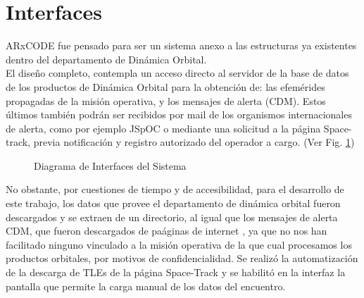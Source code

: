 \section{Interfaces}
ARxCODE fue pensado para ser un sistema anexo a las estructuras ya existentes dentro del departamento de Din\'amica Orbital.\\
El dise\~no completo, contempla un acceso directo al servidor de la base de datos de los productos de Din\'amica Orbital para la obtenci\'on de: las efem\'erides propagadas de la misi\'on operativa, y los mensajes de alerta (CDM). Estos \'ultimos tambi\'en podr\'an ser recibidos por mail de los organismos internacionales de alerta, como por ejemplo JSpOC o mediante una solicitud a la p\'agina Space-track, previa notificaci\'on y registro autorizado del operador a cargo. (Ver Fig. \ref{fig:interfaces})\\

\begin{figure}
\centering
  \caption[Diagrama de Interfaces del Sistema]{Diagrama de Interfaces del Sistema}
  \label{fig:interfaces}
\end{figure}

No obstante, por cuestiones de tiempo y de accesibilidad, para el desarrollo de este trabajo, los datos que provee el departamento de din\'amica orbital fueron descargados y se extraen de un directorio, al igual que los mensajes de alerta CDM, que fueron descargados de pa\'aginas de internet , ya que no nos han facilitado ninguno vinculado a la misi\'on operativa de la que cual procesamos los productos orbitales, por motivos de confidencialidad. Se realiz\'o la automatizaci\'on de la descarga de TLEs de la p\'agina Space-Track y se habilit\'o en la interfaz la pantalla que permite la carga manual de los datos del encuentro.\\


